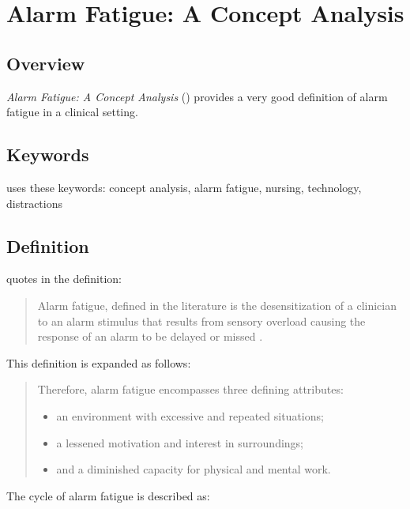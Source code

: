 \chapter{Alarm Fatigue: A Concept Analysis}

\section{Overview}

\textit{Alarm Fatigue: A Concept Analysis} (\cite{west2014alarm}) provides a very good definition of alarm fatigue in a clinical setting.

\section{Keywords}

\cite{west2014alarm} uses these keywords: concept analysis, alarm fatigue, nursing, technology, distractions

\section{Definition}

\cite{west2014alarm} quotes \cite{mccartney2012clinical} in the definition:

\begin{quote}
	Alarm fatigue, defined in the literature is the desensitization of a clinician to an alarm stimulus that results from sensory overload causing the response of an alarm to be delayed or missed \cite{mccartney2012clinical}.
\end{quote}

This definition is expanded as follows:

\begin{quotation}
	Therefore, alarm fatigue encompasses three defining attributes: 
	\begin{itemize}
		\item an environment with excessive and repeated situations;
		\item a lessened motivation and interest in surroundings;
		\item and a diminished capacity for physical and mental work.
	\end{itemize}
\end{quotation}

The cycle of alarm fatigue is described as:

